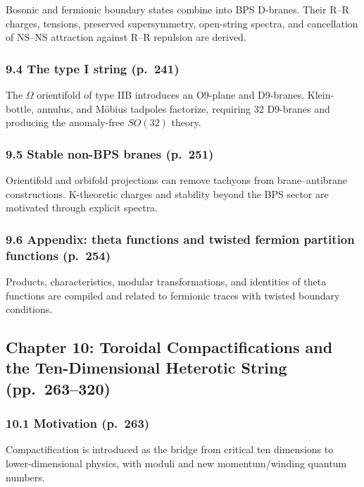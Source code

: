 \documentclass[
  10pt,
  a4paper,
  openany]{book}
\begin{document}
Bosonic and fermionic boundary states combine into BPS D-branes. Their
R--R charges, tensions, preserved supersymmetry, open-string spectra,
and cancellation of NS--NS attraction against R--R repulsion are
derived.

\subsubsection{9.4 The type I string
(p.~241)}\label{the-type-i-string-p.-241}

The \(\Omega\) orientifold of type IIB introduces an O9-plane and
D9-branes. Klein-bottle, annulus, and Möbius tadpoles factorize,
requiring 32 D9-branes and producing the anomaly-free \(SO(32)\) theory.

\subsubsection{9.5 Stable non-BPS branes
(p.~251)}\label{stable-non-bps-branes-p.-251}

Orientifold and orbifold projections can remove tachyons from
brane--antibrane constructions. K-theoretic charges and stability beyond
the BPS sector are motivated through explicit spectra.

\subsubsection{9.6 Appendix: theta functions and twisted fermion
partition functions
(p.~254)}\label{appendix-theta-functions-and-twisted-fermion-partition-functions-p.-254}

Products, characteristics, modular transformations, and identities of
theta functions are compiled and related to fermionic traces with
twisted boundary conditions.

\subsection{Chapter 10: Toroidal Compactifications and the
Ten-Dimensional Heterotic String
(pp.~263--320)}\label{chapter-10-toroidal-compactifications-and-the-ten-dimensional-heterotic-string-pp.-263320}

\subsubsection{10.1 Motivation (p.~263)}\label{motivation-p.-263}

Compactification is introduced as the bridge from critical ten
dimensions to lower-dimensional physics, with moduli and new
momentum/winding quantum numbers.
\end{document}
